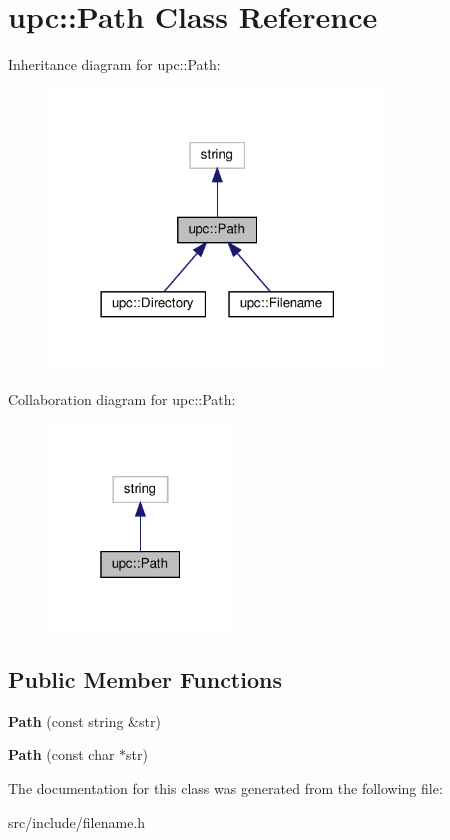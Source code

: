 \hypertarget{classupc_1_1Path}{}\section{upc\+:\+:Path Class Reference}
\label{classupc_1_1Path}


Inheritance diagram for upc\+:\+:Path\+:
\nopagebreak
\begin{figure}[H]
\begin{center}
\leavevmode
\includegraphics[width=254pt]{classupc_1_1Path__inherit__graph}
\end{center}
\end{figure}


Collaboration diagram for upc\+:\+:Path\+:
\nopagebreak
\begin{figure}[H]
\begin{center}
\leavevmode
\includegraphics[width=139pt]{classupc_1_1Path__coll__graph}
\end{center}
\end{figure}
\subsection*{Public Member Functions}
\begin{DoxyCompactItemize}
\item 
\mbox{\label{classupc_1_1Path_a364200f9a453fedd5ba68f79f8b93154}} 
{\bfseries Path} (const string \&str)
\item 
\mbox{\label{classupc_1_1Path_a082270e960275af46d65c3ce252ef581}} 
{\bfseries Path} (const char $\ast$str)
\end{DoxyCompactItemize}


The documentation for this class was generated from the following file\+:\begin{DoxyCompactItemize}
\item 
src/include/filename.\+h\end{DoxyCompactItemize}
